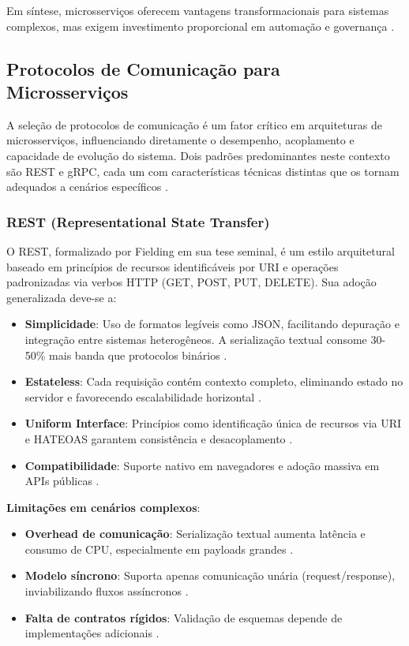 Em síntese, microsserviços oferecem vantagens transformacionais para sistemas complexos, mas exigem investimento proporcional em automação e governança \cite{nizami2020comparison, observability2023}.

\subsection{Protocolos de Comunicação para Microsserviços}
A seleção de protocolos de comunicação é um fator crítico em arquiteturas de microsserviços, influenciando diretamente o desempenho, acoplamento e capacidade de evolução do sistema. Dois padrões predominantes neste contexto são \gls{REST} e \gls{gRPC}, cada um com características técnicas distintas que os tornam adequados a cenários específicos \cite{niswar2023performance}.

\subsubsection{\gls{REST} (Representational State Transfer)}
O \gls{REST}, formalizado por Fielding \cite{fielding2000rest} em sua tese seminal, é um estilo arquitetural baseado em princípios de recursos identificáveis por \gls{URI} e operações padronizadas via verbos \gls{HTTP} (GET, POST, PUT, DELETE). Sua adoção generalizada deve-se a:

\begin{itemize}
\item \textbf{Simplicidade}: Uso de formatos legíveis como \gls{JSON}, facilitando depuração e integração entre sistemas heterogêneos. A serialização textual consome 30-50\% mais banda que protocolos binários \cite{niswar2023performance}.
\item \textbf{Estateless}: Cada requisição contém contexto completo, eliminando estado no servidor e favorecendo escalabilidade horizontal \cite{fielding2000rest}.
\item \textbf{Uniform Interface}: Princípios como identificação única de recursos via URI e \gls{HATEOAS} garantem consistência e desacoplamento \cite{maso2024comparativo}.
\item \textbf{Compatibilidade}: Suporte nativo em navegadores e adoção massiva em APIs públicas \cite{maso2024comparativo}.
\end{itemize}

\textbf{Limitações em cenários complexos}:
\begin{itemize}
\item \textbf{Overhead de comunicação}: Serialização textual aumenta latência e consumo de \gls{CPU}, especialmente em payloads grandes \cite{niswar2023performance}.
\item \textbf{Modelo síncrono}: Suporta apenas comunicação unária (request/response), inviabilizando fluxos assíncronos \cite{niswar2023performance}.
\item \textbf{Falta de contratos rígidos}: Validação de esquemas depende de implementações adicionais \cite{maso2024comparativo}.
\end{itemize}

